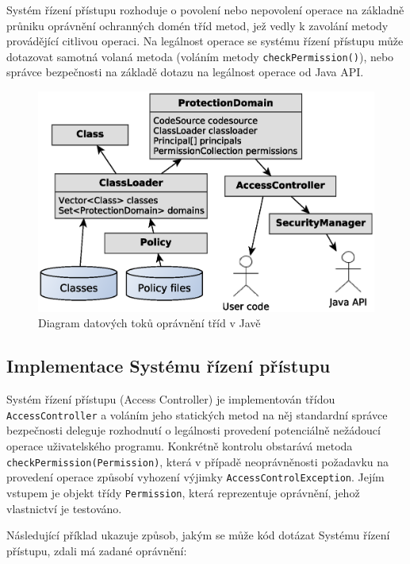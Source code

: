 Systém řízení přístupu rozhoduje o povolení nebo nepovolení operace na základně průniku oprávnění ochranných domén tříd metod, jež vedly k zavolání metody provádějící citlivou operaci. Na legálnost operace se systému řízení přístupu může dotazovat samotná volaná metoda (voláním metody {\tt checkPermission()}), nebo správce bezpečnosti na základě dotazu na legálnost operace od Java API.

\begin{figure}[ht]
  \centering
  \includegraphics[width=12cm]{fig/domain-schema}
  \caption{Diagram datových toků oprávnění tříd v Javě}
\end{figure}

\subsection{Implementace Systému řízení přístupu}\label{implementaceAC}

Systém řízení přístupu (Access Controller) je implementován třídou {\tt AccessController} a voláním jeho statických metod na něj standardní správce bezpečnosti deleguje rozhodnutí o legálnosti provedení potenciálně nežádoucí operace uživatelského programu. Konkrétně kontrolu obstarává metoda {\tt checkPermission(Permission)}, která v případě neoprávněnosti požadavku na provedení operace způsobí vyhození výjimky {\tt AccessControlException}. Jejím vstupem je objekt třídy {\tt Permission}, která reprezentuje oprávnění, jehož vlastnictví je testováno. \cite[5.5]{oaks}\cite[6]{oaks}

Následující příklad ukazuje způsob, jakým se může kód dotázat Systému řízení přístupu, zdali má zadané oprávnění: \cite[5.5]{oaks}

